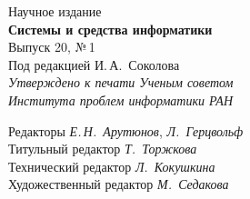 \documentclass[11pt]{book}
\begin{document}
\begin{center}\small









Научное издание\\[5mm]




{\textbf{\large  Системы и средства информатики}}\\[2mm]


{{\large  Выпуск 20, №\,1}}\\[2mm]


{{\normalsize Под редакцией И.\,А.~Соколова}}\\[4mm]


{{\normalsize \textit{Утверждено  к  печати Ученым советом}}}\\


{{\normalsize \textit{Института  проблем  информатики  РАН}}}\\











\vspace*{14mm}







Редакторы \textit{Е.\,Н.~Арутюнов},  \textit{Л.~Герцвольф}\\


Титульный редактор \textit{Т.~Торжкова}\\


Технический редактор \textit{Л.~Кокушкина}\\


Художественный редактор \textit{М.~Седакова}\\












\end{center}
\end{document}
